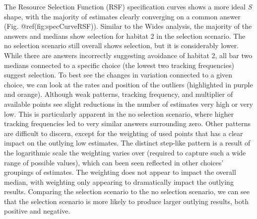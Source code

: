 \documentclass[10pt,a4paper]{article}
\begin{document}
The Resource Selection Function (RSF) specification curves shows a more ideal \emph{S} shape, with the majority of estimates clearly converging on a common answer (Fig. @ref(fig:specCurveRSF)).
Similar to the Wides analysis, the majority of the answers and medians show selection for habitat 2 in the selection scenario.
The no selection scenario still overall shows selection, but it is considerably lower.
While there are answers incorrectly suggesting avoidance of habitat 2, all bar two medians connected to a specific choice (the lowest two tracking frequencies) suggest selection.
To best see the changes in variation connected to a given choice, we can look at the rates and position of the outliers (highlighted in purple and orange).
Although weak patterns, tracking frequency, and multiplier of available points see slight reductions in the number of estimates very high or very low.
This is particularly apparent in the no selection scenario, where higher tracking frequencies led to very similar answers surrounding zero.
Other patterns are difficult to discern, except for the weighting of used points that has a clear impact on the outlying low estimates.
The distinct step-like pattern is a result of the logarithmic scale the weighting varies over (required to capture such a wide range of possible values), which can been seen reflected in other choices' groupings of estimates.
The weighting does not appear to impact the overall median, with weighting only appearing to dramatically impact the outlying results.
Comparing the selection scenario to the no selection scenario, we can see that the selection scenario is more likely to produce larger outlying results, both positive and negative.
\end{document}
